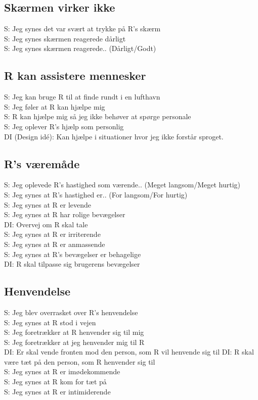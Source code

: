 \subsection{Skærmen virker ikke}
%
S: Jeg synes det var svært at trykke på R's skærm\\
S: Jeg synes skærmen reagerede dårligt\\
S: Jeg synes skærmen reagerede.. (Dårligt/Godt)\\

\subsection{R kan assistere mennesker}
%
S: Jeg kan bruge R til at finde rundt i en lufthavn\\
S: Jeg føler at R kan hjælpe mig\\
S: R kan hjælpe mig så jeg ikke behøver at spørge personale\\
S: Jeg oplever R's hjælp som personlig\\
DI (Design idé): Kan hjælpe i situationer hvor jeg ikke forstår sproget. 

\subsection{R's væremåde}
%
S: Jeg oplevede R's hastighed som værende.. (Meget langsom/Meget hurtig)\\
S: Jeg synes at R's hastighed er.. (For langsom/For hurtig)\\
S: Jeg synes at R er levende\\
S: Jeg synes at R har rolige bevægelser\\
DI: Overvej om R skal tale\\
S: Jeg synes at R er irriterende\\
S: Jeg synes at R er anmassende\\
S: Jeg synes at R's bevægelser er behagelige\\
DI: R skal tilpasse sig brugerens bevægelser

\subsection{Henvendelse}
%
S: Jeg blev overrasket over R's henvendelse\\
S: Jeg synes at R stod i vejen\\
S: Jeg foretrækker at R henvender sig til mig\\
S: Jeg foretrækker at jeg henvender mig til R\\
DI: Er skal vende fronten mod den person, som R vil henvende sig til
DI: R skal være tæt på den person, som R henvender sig til\\
S: Jeg synes at R er imødekommende\\
S: Jeg synes at R kom for tæt på\\
S: Jeg synes at R er intimiderende\\

